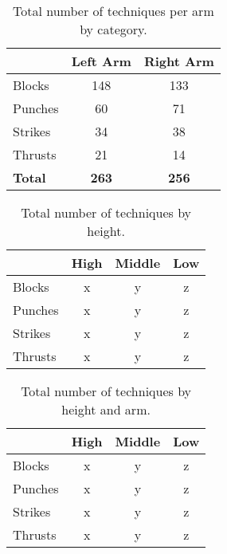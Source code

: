 \documentclass[10pt,twocolumn,a4paper]{article}
\begin{document}
\begin{table}
  \centering
  \begin{tabular}{l|c|c} \hline \hline
    & Left Arm & Right Arm \\ \hline

    Blocks    & 148   & 133 \\
    Punches   &  60   &  71 \\
    Strikes   &  34   &  38 \\
    Thrusts   &  21   &  14 \\
    \hline

    \textbf{Total}   & \textbf{263}   & \textbf{256} \\
    \hline
  \end{tabular}
  \caption{Total number of techniques per arm by category.}
  \end{table}


\begin{table}
  \centering
  \begin{tabular}{l|c|c|c} \hline \hline
    & High & Middle & Low \\ \hline

    Blocks    & x   & y   & z \\
    Punches   & x   & y   & z \\
    Strikes   & x   & y   & z \\
    Thrusts   & x   & y   & z \\
    \hline

  \end{tabular}
  \caption{Total number of techniques by height.}
  \end{table}


\begin{table}
  \centering
  \begin{tabular}{l|c|c|c} \hline \hline
    & High & Middle & Low \\ \hline

    Blocks    & x   & y   & z \\
    Punches   & x   & y   & z \\
    Strikes   & x   & y   & z \\
    Thrusts   & x   & y   & z \\
    \hline

  \end{tabular}
  \caption{Total number of techniques by height and arm.}
  \end{table}
\end{document}
